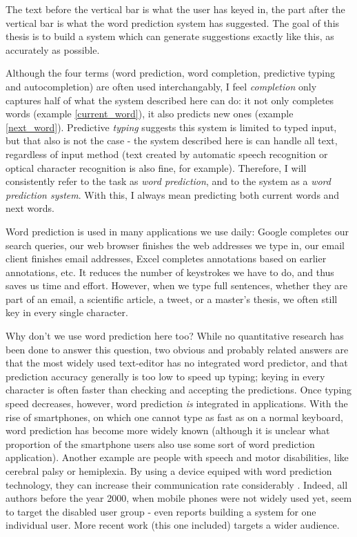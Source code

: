 \documentclass[11pt]{article}
\begin{document}
The text before the vertical bar is what the user has keyed in, the part after the vertical bar is what the word prediction system has suggested. The goal of this thesis is to build a system which can generate suggestions exactly like this, as accurately as possible. 

Although the four terms (word prediction, word completion, predictive typing and autocompletion) are often used interchangably, I feel \emph{completion} only captures half of what the system described here can do: it not only completes words (example \ref{current_word}), it also predicts new ones (example \ref{next_word}). Predictive \emph{typing} suggests this system is limited to typed input, but that also is not the case - the system described here is can handle all text, regardless of input method (text created by automatic speech recognition or optical character recognition is also fine, for example). Therefore, I will consistently refer to the task as \emph{word prediction}, and to the system as a \emph{word prediction system}. With this, I always mean predicting both current words and next words.

Word prediction is used in many applications we use daily: Google completes our search queries, our web browser finishes the web addresses we type in, our email client finishes email addresses, Excel completes annotations based on earlier annotations, etc. It reduces the number of keystrokes we have to do, and thus saves us time and effort. However, when we type full sentences, whether they are part of an email, a scientific article, a tweet, or a master's thesis, we often still key in every single character. 

Why don't we use word prediction here too? While no quantitative research has been done to answer this question, two obvious and probably related answers are that the most widely used text-editor has no integrated word predictor, and that prediction accuracy generally is too low to speed up typing; keying in every character is often faster than checking and accepting the predictions. Once typing speed decreases, however, word prediction \emph{is} integrated in applications. With the rise of smartphones,  on which one  cannot type as fast as on a normal keyboard, word prediction has become more widely known  (although it is unclear what proportion of the smartphone users also use some sort of word prediction application). Another example are  people with speech and motor disabilities, like cerebral palsy or hemiplexia. By using a device equiped with word prediction technology, they can increase their communication rate considerably \cite{Garay-Vitoria+06}. Indeed, all authors before the year 2000, when mobile phones were not widely used yet, seem to target the disabled user group -  even reports building a system for one individual user. More recent work (this one included) targets a wider audience.
\end{document}
